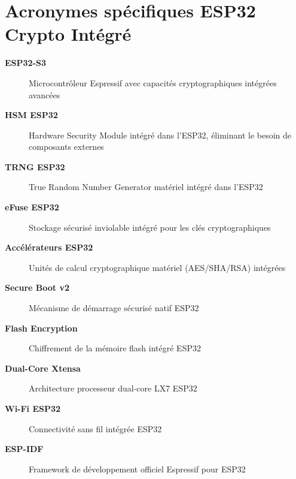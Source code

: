 \begin{acronym}[SPHINCS+]
\end{acronym}

\section*{Acronymes spécifiques ESP32 Crypto Intégré}

\begin{description}
    \item[\textbf{ESP32-S3}] Microcontrôleur Espressif avec capacités cryptographiques intégrées avancées
    \item[\textbf{HSM ESP32}] Hardware Security Module intégré dans l'ESP32, éliminant le besoin de composants externes
    \item[\textbf{TRNG ESP32}] True Random Number Generator matériel intégré dans l'ESP32
    \item[\textbf{eFuse ESP32}] Stockage sécurisé inviolable intégré pour les clés cryptographiques
    \item[\textbf{Accélérateurs ESP32}] Unités de calcul cryptographique matériel (AES/SHA/RSA) intégrées
    \item[\textbf{Secure Boot v2}] Mécanisme de démarrage sécurisé natif ESP32
    \item[\textbf{Flash Encryption}] Chiffrement de la mémoire flash intégré ESP32
    \item[\textbf{Dual-Core Xtensa}] Architecture processeur dual-core LX7 ESP32
    \item[\textbf{Wi-Fi ESP32}] Connectivité sans fil intégrée ESP32
    \item[\textbf{ESP-IDF}] Framework de développement officiel Espressif pour ESP32
\end{description}

